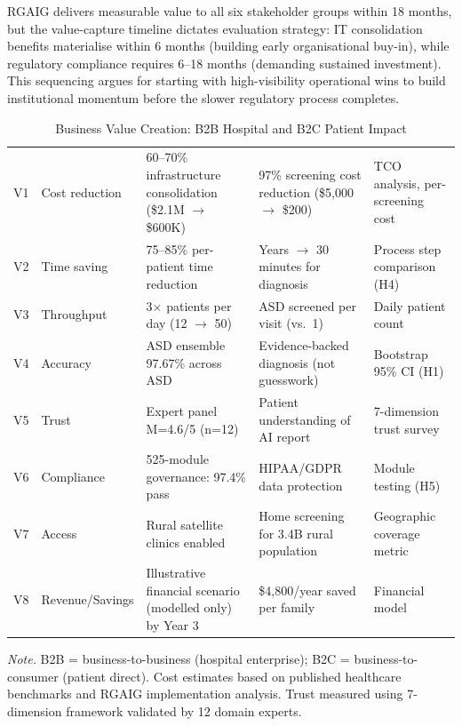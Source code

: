 RGAIG delivers measurable value to all six stakeholder groups within 18 months, but the value-capture timeline dictates evaluation strategy: IT consolidation benefits materialise within 6 months (building early organisational buy-in), while regulatory compliance requires 6--18 months (demanding sustained investment). This sequencing argues for starting with high-visibility operational wins to build institutional momentum before the slower regulatory process completes.

\begin{table}[!htbp]
\tablestripes
\tablefontsize
\caption{Business Value Creation: B2B Hospital and B2C Patient Impact}
\begin{tabularx}{\textwidth}{@{} p{0.5cm} p{3cm} p{3cm} p{2cm} L @{}}
\toprule
\thead{\#} &  &  &  &  \\
\midrule
V1 & Cost reduction & 60--70\% infrastructure consolidation (\$2.1M $\to$ \$600K) & 97\% screening cost reduction (\$5,000 $\to$ \$200) & TCO analysis, per-screening cost \\
\addlinespace
V2 & Time saving & 75--85\% per-patient time reduction & Years $\to$ 30 minutes for diagnosis & Process step comparison (H4) \\
\addlinespace
V3 & Throughput & 3$\times$ patients per day (12 $\to$ 50) & ASD screened per visit (vs.\ 1) & Daily patient count \\
\addlinespace
V4 & Accuracy & ASD ensemble 97.67\% across ASD & Evidence-backed diagnosis (not guesswork) & Bootstrap 95\% CI (H1) \\
\addlinespace
V5 & Trust & Expert panel M=4.6/5 (n=12) & Patient understanding of AI report & 7-dimension trust survey \\
\addlinespace
V6 & Compliance & 525-module governance: 97.4\% pass & HIPAA/GDPR data protection & Module testing (H5) \\
\addlinespace
V7 & Access & Rural satellite clinics enabled & Home screening for 3.4B rural population & Geographic coverage metric \\
\addlinespace
V8 & Revenue/Savings & Illustrative financial scenario (modelled only) by Year 3 & \$4,800/year saved per family & Financial model \\
\bottomrule
\end{tabularx}
\vspace{0.5em}\noindent\textit{Note.} B2B = business-to-business (hospital enterprise); B2C = business-to-consumer (patient direct). Cost estimates based on published healthcare benchmarks and RGAIG implementation analysis. Trust measured using 7-dimension framework validated by 12 domain experts.
\end{table}
\fi



